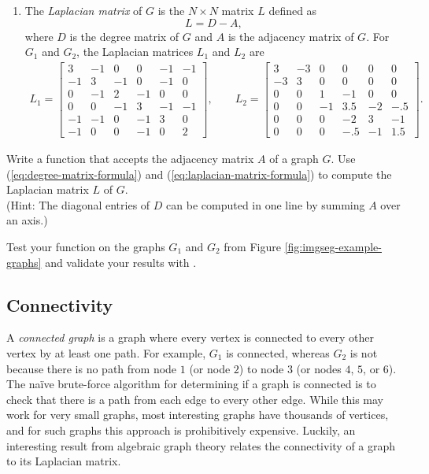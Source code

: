 \begin{enumerate}
\item The \emph{Laplacian matrix} of $G$ is the $N\times N$ matrix $L$ defined as
\begin{equation}
L = D - A,
\label{eq:laplacian-matrix-formula}
\end{equation}
where $D$ is the degree matrix of $G$ and $A$ is the adjacency matrix of $G$.
For $G_1$ and $G_2$, the Laplacian matrices $L_1$ and $L_2$ are
\begin{align*}
L_1 =\left[\begin{array}{rrrrrr}
3 & -1 & 0 & 0 & -1 & -1\\
-1 & 3 & -1 & 0 & -1 & 0\\
0 & -1 & 2 & -1 & 0 & 0\\
0 & 0 & -1 & 3 & -1 & -1\\
-1 & -1 & 0 & -1 & 3& 0\\
-1 & 0 & 0 & -1 & 0 & 2
\end{array}\right],
\qquad L_2 =
 \left[\begin{array}{rrrrrr}
3 & -3 & 0 & 0 & 0 & 0\\
-3 & 3 & 0 & 0 & 0 & 0\\
0 & 0 & 1 & -1 & 0 & 0\\
0 & 0 & -1 & 3.5 & -2 & -.5\\
0 & 0 & 0 & -2 & 3 & -1\\
0 & 0 & 0 &- .5 & -1 & 1.5
\end{array}\right].
\end{align*}
\end{enumerate}

\begin{problem}
Write a function that accepts the adjacency matrix $A$ of a graph $G$.
Use (\ref{eq:degree-matrix-formula}) and (\ref{eq:laplacian-matrix-formula}) to compute the Laplacian matrix $L$ of $G$.
\\(Hint: The diagonal entries of $D$ can be computed in one line by summing $A$ over an axis.)

Test your function on the graphs $G_1$ and $G_2$ from Figure \ref{fig:imgseg-example-graphs} and validate your results with .
\label{prob:imgseg-laplacian}
\end{problem}
\subsection*{Connectivity} %

A \emph{connected graph} is a graph where every vertex is connected to every other vertex by at least one path.
For example, $G_1$ is connected, whereas $G_2$ is not because there is no path from node $1$ (or node $2$) to node $3$ (or nodes $4$, $5$, or $6$).
The na\"ive brute-force algorithm for determining if a graph is connected is to check that there is a path from each edge to every other edge.
While this may work for very small graphs, most interesting graphs have thousands of vertices, and for such graphs this approach is prohibitively expensive.
Luckily, an interesting result from algebraic graph theory relates the connectivity of a graph to its Laplacian matrix.

